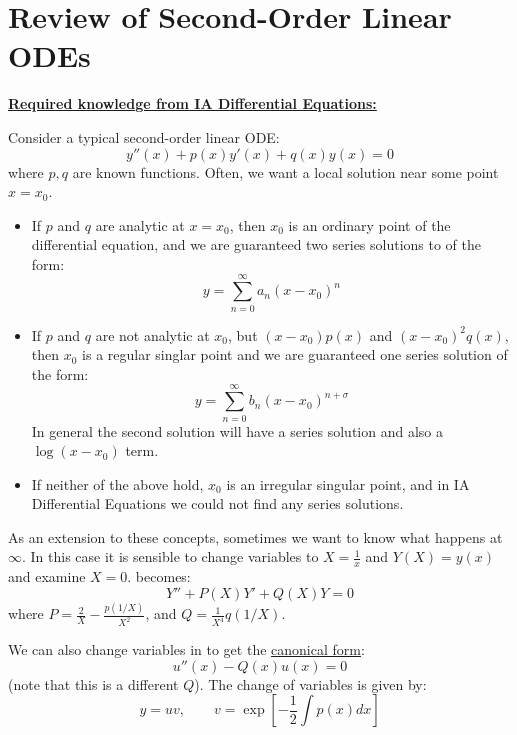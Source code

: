 \documentclass[../Main.tex]{subfiles}
\begin{document}
\section{Review of Second-Order Linear ODEs}
\noindent\underline{\textbf{Required knowledge from IA Differential Equations:}}
\begin{leftbartext}
    Consider a typical second-order linear ODE:
    \begin{equation}
        y''(x) + p(x) y'(x) + q(x) y(x) = 0
        \label{eqnSODE}
    \end{equation}
    where $p, q$ are known functions. Often, we want a local solution near some point $x = x_0$.
    \begin{itemize}
        \item If $p$ and $q$ are analytic at $x = x_0$, then $x_0$ is an ordinary point of the differential equation, and we are guaranteed two series solutions to  of the form:
            \begin{equation*}
                y = \sum_{n=0}^{\infty} a_n(x - x_0)^n
            \end{equation*}
        \item If $p$ and $q$ are not analytic at $x_0$, but $(x - x_0)p(x)$ and $(x - x_0)^2 q(x)$, then $x_0$ is a regular singlar point and we are guaranteed one series solution of the form:
            \begin{equation*}
                y = \sum_{n=0}^{\infty} b_n (x - x_0)^{n+\sigma}
            \end{equation*}
            In general the second solution will have a series solution and also a $\log(x - x_0)$ term.
        \item If neither of the above hold, $x_0$ is an irregular singular point, and in IA Differential Equations we could not find any series solutions.
    \end{itemize}
\end{leftbartext}
As an extension to these concepts, sometimes we want to know what happens at $\infty$. In this case it is sensible to change variables to $X = \frac1x$ and $Y(X) = y(x)$ and examine $X = 0$.  becomes:
\begin{equation*}
    Y'' + P(X) Y' + Q(X) Y = 0
\end{equation*}
where $P = \frac2X - \frac{p(1/X)}{X^2}$, and $Q = \frac1{X^4} q(1/X)$.

We can also change variables in  to get the \underline{canonical form}:
\begin{equation}
    u''(x) - Q(x) u(x) = 0
    \label{eqnSODECanon}
\end{equation}
(note that this is a different $Q$). The change of variables is given by:
\begin{equation*}
    y = uv,\qquad v = \exp\left[-\frac12 \int p(x) dx\right]
\end{equation*}
\end{document}
